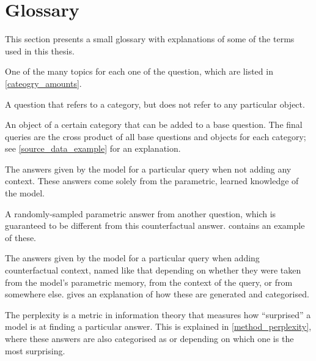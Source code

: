 \section*{Glossary}
\label{glossary}

This section presents a small glossary with explanations of some of the terms used in this thesis.

\begin{description}[style=nextline]
	\item[Category]
		One of the many topics for each one of the question, which are listed in \cref{cateogry_amounts}.

	\item[Base Questions]
		A question that refers to a category, but does not refer to any particular object.
	\item[Objects]
		An object of a certain category that can be added to a base question.
		The final queries are the cross product of all base questions and objects for each category; see \cref{source_data_example} for an explanation.

	\item[Parametric Answers]
		The answers given by the model for a particular query when not adding any context. These answers come solely from the parametric, learned knowledge of the model.
	\item[Counterfactual Answer]
		A randomly-sampled parametric answer from another question, which is guaranteed to be different from this counterfactual answer.
		 contains an example of these.

	\item[\Parametric{}, \Contextual{}, and \Other{} answers]
		The answers given by the model for a particular query when adding counterfactual context, named like that depending on whether they were taken from the model's parametric memory, from the context of the query, or from somewhere else.
		 gives an explanation of how these are generated and categorised.

	\item[Perplexity of an answer]
		The perplexity is a metric in information theory that measures how ``surprised'' a model is at finding a particular answer.
		This is explained in \cref{method_perplexity}, where these answers are also categorised as \Parametric{} or \Contextual{} depending on which one is the most surprising.
\end{description}
